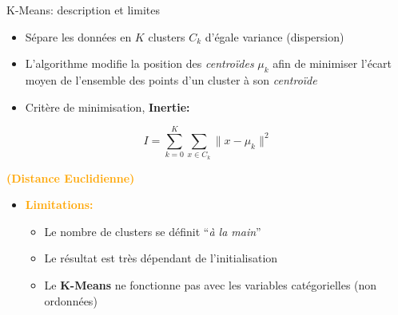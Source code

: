 \begin{frame}{K-Means: description et limites}
  \begin{itemize}
  \item Sépare les données en $K$ clusters $C_{k}$ d'égale variance (dispersion)
  \item L'algorithme modifie la position des \textit{centroïdes} $\mu_{k}$ afin de minimiser l'écart moyen de l'ensemble des points d'un cluster à son \textit{centroïde}
  \end{itemize}
  \vspace{-0.5cm}
  \begin{minipage}{0.55\textwidth}
    \begin{itemize}
    \item Critère de minimisation, \textbf{Inertie:}
    \end{itemize}
    \begin{equation*}
      I = \displaystyle\sum_{k=0}^{K}\displaystyle\sum_{x \in C_{k}}\|x-\mu_{k}\|^{2}
    \end{equation*}
    \begin{center}
      \textbf{\textcolor{orange}{(Distance Euclidienne)}}
    \end{center}
  \end{minipage}
  \hfill
  \begin{minipage}{0.4\textwidth}
  \end{minipage}
  \vspace{-1cm}
  \begin{itemize}
  \item \textbf{\textcolor{orange}{Limitations:}}
    \begin{itemize}
      \normalsize
    \item Le nombre de clusters se définit ``\textit{à la main}''
    \item Le résultat est très dépendant de l'initialisation
    \item Le \textbf{K-Means} ne fonctionne pas avec les variables catégorielles (non ordonnées)
    \end{itemize}
  \end{itemize}
\end{frame}

